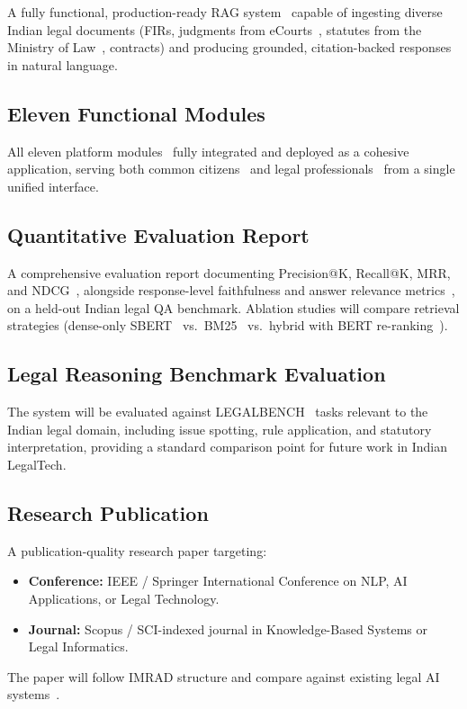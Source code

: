 \documentclass[12pt,a4paper]{article}
\begin{document}
A fully functional, production-ready RAG system~\cite{lewis2020rag} capable of
ingesting diverse Indian legal documents (FIRs, judgments from eCourts~\cite{ecourts},
statutes from the Ministry of Law~\cite{mlaw}, contracts) and producing grounded,
citation-backed responses in natural language.

\subsection{Eleven Functional Modules}

All eleven platform modules~\cite{ashley2017ai} fully integrated and deployed as a
cohesive application, serving both common citizens~\cite{const_india} and legal
professionals~\cite{mlaw} from a single unified interface.

\subsection{Quantitative Evaluation Report}

A comprehensive evaluation report documenting Precision@K, Recall@K, MRR, and
NDCG~\cite{manning2008ir}, alongside response-level faithfulness and answer relevance
metrics~\cite{lewis2020rag}, on a held-out Indian legal QA benchmark. Ablation studies
will compare retrieval strategies (dense-only SBERT~\cite{reimers2019sbert} vs.\
BM25~\cite{manning2008ir} vs.\ hybrid with BERT re-ranking~\cite{devlin2019bert}).

\subsection{Legal Reasoning Benchmark Evaluation}

The system will be evaluated against LEGALBENCH~\cite{guha2023legalbench} tasks
relevant to the Indian legal domain, including issue spotting, rule application,
and statutory interpretation, providing a standard comparison point for future work
in Indian LegalTech.

\subsection{Research Publication}

A publication-quality research paper targeting:
\begin{itemize}[leftmargin=*]
  \item \textbf{Conference:} IEEE / Springer International Conference on NLP, AI
    Applications, or Legal Technology.
  \item \textbf{Journal:} Scopus / SCI-indexed journal in Knowledge-Based Systems
    or Legal Informatics.
\end{itemize}
The paper will follow IMRAD structure and compare against existing legal AI
systems~\cite{feng2022survey, cui2022survey, guha2023legalbench, indiankanoon}.
\end{document}
